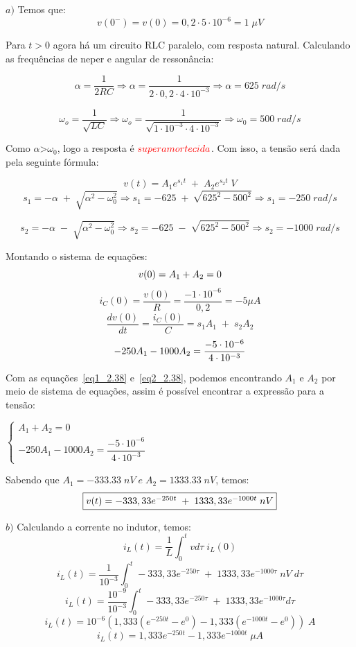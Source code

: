 \documentclass[
	12pt,				%
	oneside,			%
	a4paper,			%
	english,			%
	french,				%
	spanish,			%
	brazil				%
	]{abntex2}
\begin{document}
$a)$ Temos que:
$$v(0^-)=v(0)=0,2\cdot5\cdot10^{-6}=1\;\mu V$$

Para $t>0$ agora há um circuito RLC paralelo, com resposta natural. Calculando as frequências de neper e angular de ressonância:

$$\alpha=\dfrac{1}{2RC} \Longrightarrow \alpha=\dfrac{1}{2\cdot0,2\cdot4\cdot10^{-3}} \Longrightarrow \alpha=625\;rad/s$$

$$\omega_o=\dfrac{1}{\sqrt{LC}} \Longrightarrow \omega_o=\dfrac{1}{\sqrt{1\cdot10^{-3}\cdot 4\cdot10^{-3}}} \Longrightarrow \omega_0=500\;rad/s$$

Como $\alpha$\;>\;$\omega_0$, logo a resposta é $\textcolor{red}{superamortecida}$. Com isso, a tensão será dada pela seguinte fórmula:

$$v(t)=A_1e^{s_1 t}\;+\;A_2e^{s_2 t}\;V$$
$$s_{1}=-\alpha\;+\;\sqrt{\alpha^2-\omega_0^2} \Longrightarrow s_{1}=-625\;+\:\sqrt{625^2-500^2} \Longrightarrow s_{1}=-250\;rad/s$$

$$s_{2}=-\alpha\;-\;\sqrt{\alpha^2-\omega_0^2} \Longrightarrow s_{2}=-625\;-\;\sqrt{625^2-500^2} \Longrightarrow s_{2}=-1000\;rad/s$$

Montando o sistema de equações:
\begin{equation}
    \centering
    v(0)=A_1+A_2 = 0
    \label{eq1_2.38}
\end{equation}
$$i_C(0)=\dfrac{v(0)}{R}=\dfrac{-1\cdot10^{-6}}{0,2}=-5 \mu A$$
$$\dfrac{dv(0)}{dt}=\dfrac{i_C(0)}{C}=s_1A_1\;+\;s_2A_2$$
\begin{equation}
    \centering
    -250A_1-1000A_2 = \dfrac{-5\cdot10^{-6}}{4\cdot10^{-3}}
    \label{eq2_2.38}
\end{equation}

Com as equações~\eqref{eq1_2.38} e~\eqref{eq2_2.38}, podemos encontrando $A_1$ e $A_2$ por meio de sistema de equações, assim é possível encontrar a expressão para a tensão:

$\begin{cases}
    A_1+A_2 = 0 \\
    -250A_1-1000A_2 = \dfrac{-5\cdot10^{-6}}{4\cdot10^{-3}}
\end{cases}$

Sabendo que $A_1=-333.33\;nV\;e\;A_2=1333.33\;nV$, temos:
\begin{equation}
    \fbox{$v(t)=-333,33e^{-250t}\;+\;1333,33e^{-1000t}\;nV$}
\end{equation}

$b)$ Calculando a corrente no indutor, temos:
$$i_L(t)=\dfrac{1}{L}\int_{0}^{t}vd\tau\;i_L(0)$$
$$i_L(t)=\dfrac{1}{10^{-3}}\int_{0}^{t}-333,33e^{-250\tau}\;+\;1333,33e^{-1000\tau}\;nV\;d\tau$$
$$i_L(t)=\dfrac{10^{-9}}{10^{-3}}\int_{0}^{t}-333,33e^{-250\tau}\;+\;1333,33e^{-1000\tau}d\tau$$
$$i_L(t)=10^{-6}(1,333(e^{-250t}-e^0)-1,333(e^{-1000t}-e^0))\;A$$
$$i_L(t)=1,333e^{-250t}-1,333e^{-1000t}\;\mu A$$
\end{document}
